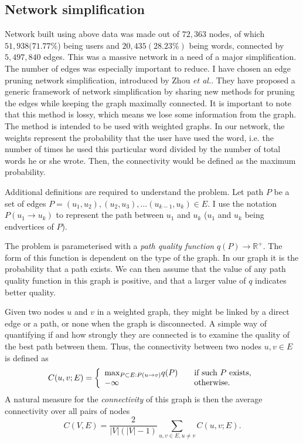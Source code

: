   \subsection{Network simplification}

    Network built using above data was made out of $72,363$ nodes, of which $51,938 (71.77\%$) being users and $20,435 (28.23\%)$ being words, connected by $5,497,840$ edges. This was a massive network in a need of a major simplification. The number of edges was especially important to reduce. I have chosen an edge pruning network simplification, introduced by Zhou \textit{et al.}\cite{ZhouMahlerToivonen2012}. They have proposed a generic framework of network simplification by sharing new methods for pruning the edges while keeping the graph maximally connected. It is important to note that this method is lossy, which means we lose some information from the graph. The method is intended to be used with weighted graphs. In our network, the weights represent the probability that the user have used the word, i.e. the number of times he used this particular word divided by the number of total words he or she wrote. Then, the connectivity would be defined as the maximum probability.
    
    Additional definitions are required to understand the problem. Let path $P$ be a set of edges $P = {(u_1, u_2), (u_2, u_3), \ldots (u_{k-1}, u_k)} \in E$. I use the notation $P(u_1 \to u_k)$ to represent the path between $u_1$ and $u_k$ ($u_1$ and $u_k$ being endvertices of $P$).
  
    The problem is parameterised with a \emph{path quality function} $q(P) \to \mathbb{R}^+$. The form of this function is dependent on the type of the graph. In our graph it is the probability that a path exists. We can then assume that the value of any path quality function in this graph is positive, and that a larger value of $q$ indicates better quality.
    
    Given two nodes $u$ and $v$ in a weighted graph, they might be linked by a direct edge or a path, or none when the graph is disconnected. A simple way of quantifying if and how strongly they are connected is to examine the quality of the best path between them\cite{ToivonenMahlerZhou2010}. Thus, the connectivity between two nodes $u, v \in E$ is defined as
    \begin{equation}
      C(u, v; E) = \left\{
      \begin{array}{l l}
        \mbox{max}_{P \subset E: P(u \to v)} q(P) & \quad \text{if such $P$ exists,}\\
        -\infty & \quad \text{otherwise.}
      \end{array}
      \right.
    \end{equation}
    A natural measure for the \emph{connectivity} of this graph is then the average connectivity over all pairs of nodes
    \begin{equation}
    C(V, E) = \frac{2}{|V|(|V|-1)} \sum_{u, v\in E, u \neq v} C(u, v; E) \mbox{.}
    \end{equation}
    
